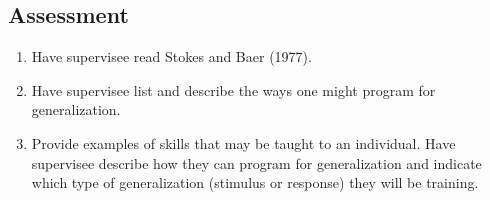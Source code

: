\subsection{Assessment}
\begin{enumerate}
\item Have supervisee read Stokes and Baer (1977).
\item Have supervisee list and describe the ways one might program for generalization.
\item Provide examples of skills that may be taught to an individual. Have supervisee describe how they can program for generalization and indicate which type of generalization (stimulus or response) they will be training.
\end{enumerate}
%
